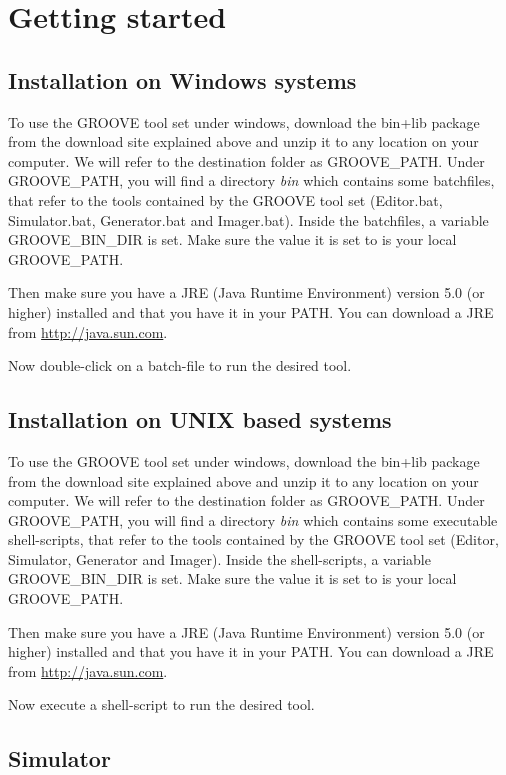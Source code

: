 \section{Getting started}

\subsection{Installation on Windows systems}

To use the GROOVE tool set under windows, download the bin+lib package from the download site explained above and unzip it to any location on your computer. We will refer to the destination folder as GROOVE\_PATH. Under GROOVE\_PATH, you will find a directory \emph{bin} which contains some batchfiles, that refer to the tools contained by the GROOVE tool set (Editor.bat, Simulator.bat, Generator.bat and Imager.bat). Inside the batchfiles, a variable GROOVE\_BIN\_DIR is set. Make sure the value it is set to is your local GROOVE\_PATH.

Then make sure you have a JRE (Java Runtime Environment) version 5.0 (or higher) installed and that you have it in your PATH. You can download a JRE from \url{http://java.sun.com}.

Now double-click on a batch-file to run the desired tool.

\subsection{Installation on UNIX based systems}

To use the GROOVE tool set under windows, download the bin+lib package from the download site explained above and unzip it to any location on your computer. We will refer to the destination folder as GROOVE\_PATH. Under GROOVE\_PATH, you will find a directory \emph{bin} which contains some executable shell-scripts, that refer to the tools contained by the GROOVE tool set (Editor, Simulator, Generator and Imager). Inside the shell-scripts, a variable GROOVE\_BIN\_DIR is set. Make sure the value it is set to is your local GROOVE\_PATH.

Then make sure you have a JRE (Java Runtime Environment) version 5.0 (or higher) installed and that you have it in your PATH. You can download a JRE from \url{http://java.sun.com}.

Now execute a shell-script to run the desired tool.

\subsection{Simulator}

